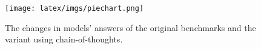 \begin{figure}[th!]
\centering
\texttt{[image: latex/imgs/piechart.png]}
\caption{The changes in models' answers of the original benchmarks and the \wicds variant using chain-of-thoughts. }
\label{fig:piechart}
\end{figure} 